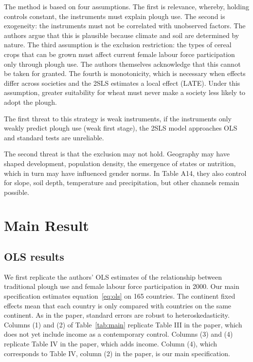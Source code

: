 \documentclass[12pt,a4paper]{article}
\newif\ifshowinstr
\newcommand{\instr}[1]{\ifshowinstr{\leavevmode\color{gray}\itshape\small [#1]\par}\fi}
\begin{document}
The method is based on four assumptions. The first is relevance, whereby, holding controls constant, the instruments must explain plough use. The second is exogeneity: the instruments must not be correlated with unobserved factors. The authors argue that this is plausible because climate and soil are determined by nature. The third assumption is the exclusion restriction: the types of cereal crops that can be grown must affect current female labour force participation only through plough use. The authors themselves acknowledge that this cannot be taken for granted. The fourth is monotonicity, which is necessary when effects differ across societies and the 2SLS estimates a local effect (LATE). Under this assumption, greater suitability for wheat must never make a society less likely to adopt the plough.

The first threat to this strategy is weak instruments, if the instruments only weakly predict plough use (weak first stage), the 2SLS model approaches OLS and standard tests are unreliable.

The second threat is that the exclusion may not hold. Geography may have shaped development, population density, the emergence of states or nutrition, which in turn may have influenced gender norms. In Table A14, they also control for slope, soil depth, temperature and precipitation, but other channels remain possible.

\section{Main Result}

\subsection{OLS results}

\instr{This part should include your main replication table (Table~\ref{tab:main}) and figure(s) (at least Figure~\ref{fig:main}). Replicate at least what you consider the main column of the main results table, as well as one or two figures that visualize the result. Do your results differ? Worksheet~A.3 helps you think about why they might differ. It is fine if you cannot replicate a number exactly, as long as you understand why.}

We first replicate the authors' OLS estimates of the relationship between traditional plough use and female labour force participation in 2000. Our main specification estimates equation~\eqref{eq:ols} on 165 countries. The continent fixed effects mean that each country is only compared with countries on the same continent. As in the paper, standard errors are robust to heteroskedasticity. Columns (1) and (2) of Table~\ref{tab:main} replicate Table III in the paper, which does not yet include income as a contemporary control. Columns (3) and (4) replicate Table IV in the paper, which adds income. Column (4), which corresponds to Table IV, column (2) in the paper, is our main specification.
\end{document}
